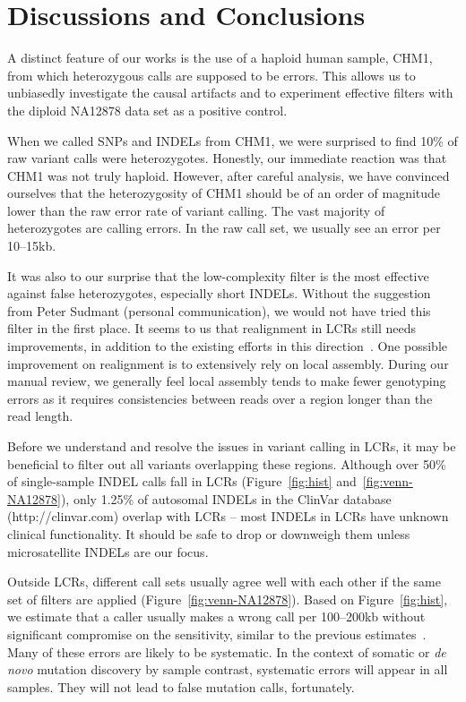 \documentclass{bioinfo}
\begin{document}
\section{Discussions and Conclusions}
A distinct feature of our works is the use of a haploid human sample, CHM1,
from which heterozygous calls are supposed to be errors. This allows us to unbiasedly
investigate the causal artifacts and to experiment effective filters with the
diploid NA12878 data set as a positive control.

When we called SNPs and INDELs from CHM1, we were surprised to find 10\% of raw
variant calls were heterozygotes. Honestly, our immediate reaction was that
CHM1 was not truly haploid. However, after careful analysis, we have convinced
ourselves that the heterozygosity of CHM1 should be of an order of magnitude
lower than the raw error rate of variant calling. The vast majority of
heterozygotes are calling errors. In the raw call set, we usually see an error
per 10--15kb.

It was also to our surprise that the low-complexity filter is the most
effective against false heterozygotes, especially short INDELs. Without the
suggestion from Peter Sudmant (personal communication), we would not have tried
this filter in the first place. It seems to us that realignment in LCRs
still needs improvements, in addition to the existing efforts in this
direction~\citep{Homer:2010aa,Li:2011kx,Albers:2011aa}. One possible improvement on realignment is to extensively rely on
local assembly. During our manual review, we generally feel local assembly
tends to make fewer genotyping errors as it requires consistencies between
reads over a region longer than the read length.

Before we understand and resolve the issues in variant calling in LCRs,
it may be beneficial to filter out all variants overlapping these regions.
Although over 50\% of single-sample INDEL calls fall in LCRs
(Figure~\ref{fig:hist} and~\ref{fig:venn-NA12878}), only 1.25\% of autosomal
INDELs in the ClinVar database (http://clinvar.com) overlap with LCRs -- most
INDELs in LCRs have unknown clinical functionality. It should be safe to drop or downweigh
them unless microsatellite INDELs are our focus.

Outside LCRs, different call sets usually agree well with each other
if the same set of filters are applied (Figure~\ref{fig:venn-NA12878}). Based
on Figure~\ref{fig:hist}, we estimate that a caller usually makes a wrong call
per 100--200kb without significant compromise on the sensitivity, similar to
the previous estimates~\citep{Bentley:2008cr,Nickles:2012aa}. Many of these
errors are likely to be systematic. In the context of somatic or \emph{de novo}
mutation discovery by sample contrast, systematic errors will appear in all
samples.  They will not lead to false mutation calls, fortunately.
\end{document}
